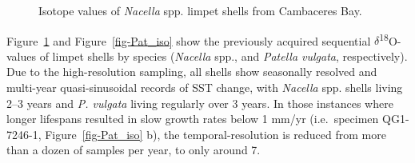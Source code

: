 \documentclass[
  authoryear,
  preprint,
  3p]{elsarticle}
\begin{document}
\begin{figure}


\caption{\label{fig-Nac_iso}Isotope values of \emph{Nacella} spp. limpet
shells from Cambaceres Bay.}

\end{figure}%

Figure~\ref{fig-Nac_iso} and Figure~\ref{fig-Pat_iso} show the
previously acquired sequential $\delta$\textsuperscript{18}O-values of
limpet shells by species (\emph{Nacella} spp., and \emph{Patella
vulgata}, respectively). Due to the high-resolution sampling, all shells
show seasonally resolved and multi-year quasi-sinusoidal records of SST
change, with \emph{Nacella} spp. shells living 2--3 years and \emph{P.
vulgata} living regularly over 3 years. In those instances where longer
lifespans resulted in slow growth rates below 1 mm/yr (i.e.~specimen
QG1-7246-1, Figure~\ref{fig-Pat_iso} b), the temporal-resolution is
reduced from more than a dozen of samples per year, to only around 7.
\end{document}
